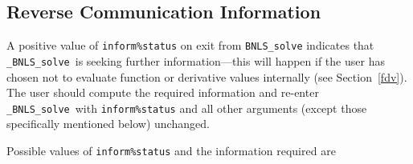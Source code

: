 \documentclass{galahad}
\newcommand{\packagename}{BNLS}
\newcommand{\fullpackagename}{\libraryname\_\packagename}
\newcommand{\solver}{{\tt \fullpackagename\_solve}}
\begin{document}

\subsection{\label{reverse}Reverse Communication Information}

A positive value of {\tt inform\%status} on exit from
{\tt \packagename\_solve}
indicates that
\solver\ is seeking further information---this will happen
if the user has chosen not to evaluate function or
derivative values internally (see Section~\ref{fdv}).
The user should compute the required information and re-enter \solver\
with {\tt inform\%status} and all other arguments (except those specifically
mentioned below) unchanged.

Possible values of {\tt inform\%status} and the information required are
\end{document}
